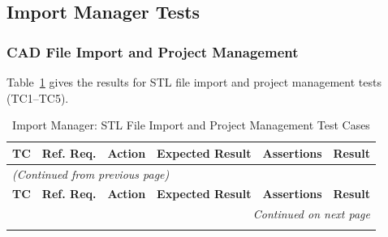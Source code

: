 \documentclass[12pt, titlepage]{article}
\begin{document}
\subsection{Import Manager Tests}
\newcommand{\testcount}{\stepcounter{testcase}\thetestcase}
\renewcommand{\arraystretch}{2}

\subsubsection{CAD File Import and Project Management}
Table~\ref{table:im_cad_tests} gives the results for STL file import and project management tests (TC1--TC5).

\begin{longtable}{c
    >{\raggedright\arraybackslash}p{1cm}
    >{\raggedright\arraybackslash}p{2.5cm}
    >{\raggedright\arraybackslash}p{3.5cm}
  >{\raggedright\arraybackslash}p{5cm} c}
  \caption{Import Manager: STL File Import and Project Management Test Cases}
  \label{table:im_cad_tests} \\
  \toprule
  \textbf{TC} & \textbf{Ref. Req.} & \textbf{Action} &
  \textbf{Expected Result} & \textbf{Assertions} & \textbf{Result} \\
  \midrule
  \endfirsthead

  \multicolumn{6}{l}{\textit{(Continued from previous page)}} \\
  \toprule
  \textbf{TC} & \textbf{Ref. Req.} & \textbf{Action} &
  \textbf{Expected Result} & \textbf{Assertions} & \textbf{Result} \\
  \midrule
  \endhead

  \multicolumn{6}{r}{\textit{Continued on next page}} \\
  \endfoot

  \bottomrule
  \endlastfoot


\end{longtable}
\end{document}
